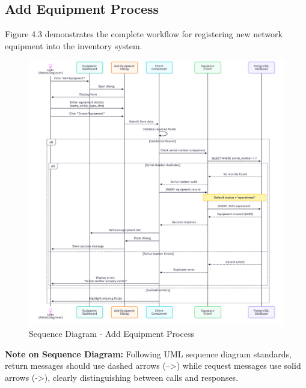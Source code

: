 \subsection{Add Equipment Process}

Figure 4.3 demonstrates the complete workflow for registering new network equipment into the inventory system.

\begin{figure}[H]
    \centering
    \includegraphics[width=0.95\linewidth]{img/chap_04/add_equipment_sequence.png}
    \caption{Sequence Diagram - Add Equipment Process}
    \label{fig:sequence_add_equipment}
\end{figure}

\textbf{Note on Sequence Diagram:} Following UML sequence diagram standards, return messages should use dashed arrows (-->) while request messages use solid arrows (->), clearly distinguishing between calls and responses.

